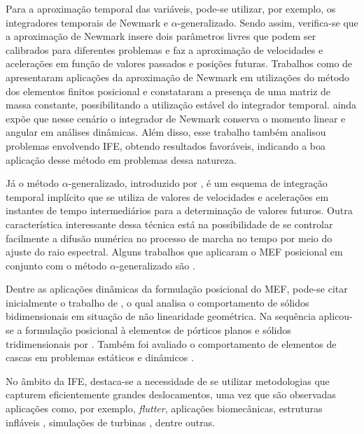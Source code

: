 Para a aproximação temporal das variáveis, pode-se utilizar, por exemplo, os integradores temporais de Newmark e $\alpha$-generalizado. Sendo assim, verifica-se que a aproximação de Newmark insere dois parâmetros livres que podem ser calibrados para diferentes problemas e faz a aproximação de velocidades e acelerações em função de valores passados e posições futuras. Trabalhos como de  apresentaram aplicações da aproximação de Newmark em utilizações do método dos elementos finitos posicional e constataram a presença de uma matriz de massa constante, possibilitando a utilização estável do integrador temporal.  ainda expõe que nesse cenário o integrador de Newmark conserva o momento linear e angular em análises dinâmicas. Além disso, esse trabalho também analisou problemas envolvendo IFE, obtendo resultados favoráveis, indicando a boa aplicação desse método em problemas dessa natureza.

Já o método $\alpha$-generalizado, introduzido por , é um esquema de integração temporal implícito que se utiliza de valores de velocidades e acelerações em instantes de tempo intermediários para a determinação de valores futuros. Outra característica interessante dessa técnica está na possibilidade de se controlar facilmente a difusão numérica no processo de marcha no tempo por meio do ajuste do raio espectral. Alguns trabalhos que aplicaram o MEF posicional em conjunto com o método $\alpha$-generalizado são .

Dentre as aplicações dinâmicas da formulação posicional do MEF, pode-se citar inicialmente o trabalho de , o qual analisa o comportamento de sólidos bidimensionais em situação de não linearidade geométrica. Na sequência aplicou-se a formulação posicional à elementos de pórticos planos e sólidos tridimensionais por . Também foi avaliado o comportamento de elementos de cascas em problemas estáticos \cite{coda2007alternative} e dinâmicos \cite{coda2009unconstrained}.

No âmbito da IFE, destaca-se a necessidade de se utilizar metodologias que capturem eficientemente grandes deslocamentos, uma vez que são observadas aplicações como, por exemplo, \textit{flutter}, aplicações biomecânicas, estruturas infláveis \cite{karagiozis2011computational}, simulações de turbinas \cite{bazilevs20113d}, dentre outras.

